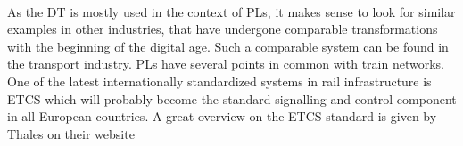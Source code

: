 \\
As the \ac{DT} is mostly used in the context of \acp{PL}, it makes sense to look for similar examples in other industries, that have undergone comparable transformations with the beginning of the digital age.
Such a comparable system can be found in the transport industry. 
\acp{PL} have several points in common with train networks.
One of the latest internationally standardized systems in rail infrastructure is \ac{ETCS} which will probably become the standard signalling and control component in all European countries. 
A great overview on the \ac{ETCS}-standard is given by Thales on their website \cite{ThalesETCS}
























